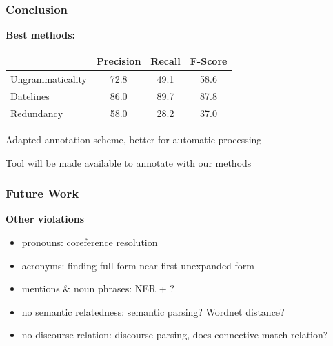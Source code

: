 \documentclass[table]{beamer}
\begin{document}
\begin{frame}
  \frametitle{Conclusion}

  \textbf{Best methods:}
  \vspace{0.5cm}

  \begin{tabular}{l|c|c|c|}
  \hline
   & Precision & Recall & F-Score\\
  \hline
  Ungrammaticality & 72.8 & 49.1 & 58.6\\
  \hline
  Datelines & 86.0 & 89.7 & 87.8\\
  \hline
  Redundancy & 58.0 & 28.2 & 37.0\\
  \hline
  \end{tabular}\pause

  \vspace{0.5cm}
  Adapted annotation scheme, better for automatic processing\pause

  \vspace{0.5cm}
  Tool will be made available to annotate with our methods
\end{frame}

\begin{frame}
  \frametitle{Future Work}
  \textbf{Other violations}
  \begin{itemize}
    \item pronouns: coreference resolution
    \item acronyms: finding full form near first unexpanded form
    \item mentions \& noun phrases: NER + ?
    \item no semantic relatedness: semantic parsing? Wordnet distance?
    \item no discourse relation: discourse parsing, does connective match relation?
  \end{itemize}
\end{frame}
\end{document}
